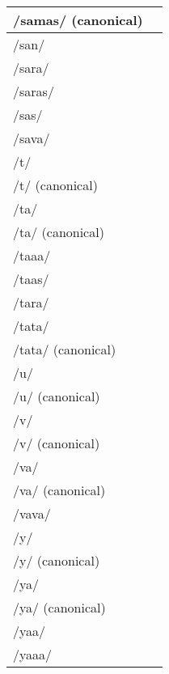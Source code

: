 \documentclass{article}
\begin{document}
\begin{longtable}{|l|p{}|}
/samas/ (canonical) & \textIndus{} \\ \hline
/san/ & \textIndus{} \\ \hline
/sara/ & \textIndus{} \\ \hline
/saras/ & \textIndus{} \\ \hline
/sas/ & \textIndus{} \\ \hline
/sava/ & \textIndus{} \\ \hline
/t/ & \textIndus{} \\ \hline
/t/ (canonical) & \textIndus{} \\ \hline
/ta/ & \textIndus{} \\ \hline
/ta/ (canonical) & \textIndus{} \\ \hline
/taaa/ & \textIndus{} \\ \hline
/taas/ & \textIndus{} \\ \hline
/tara/ & \textIndus{} \\ \hline
/tata/ & \textIndus{} \\ \hline
/tata/ (canonical) & \textIndus{} \\ \hline
/u/ & \textIndus{} \\ \hline
/u/ (canonical) & \textIndus{} \\ \hline
/v/ & \textIndus{} \\ \hline
/v/ (canonical) & \textIndus{} \\ \hline
/va/ & \textIndus{} \\ \hline
/va/ (canonical) & \textIndus{} \\ \hline
/vava/ & \textIndus{} \\ \hline
/y/ & \textIndus{} \\ \hline
/y/ (canonical) & \textIndus{} \\ \hline
/ya/ & \textIndus{} \\ \hline
/ya/ (canonical) & \textIndus{} \\ \hline
/yaa/ & \textIndus{} \\ \hline
/yaaa/ & \textIndus{} \\ \hline
\end{longtable}
\end{document}
